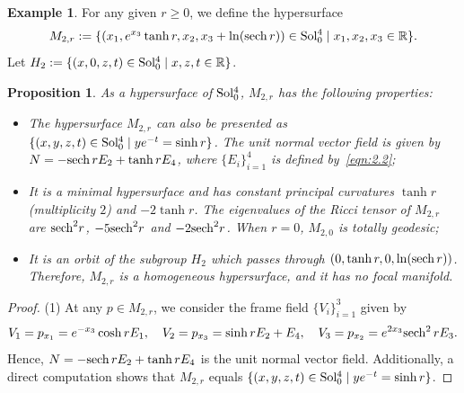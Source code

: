 \documentclass[reqno]{amsart}%
\newtheorem{proposition}[theorem]{Proposition}
\theoremstyle{definition}
\newtheorem{example}{Example}[section]  %
\numberwithin{equation}{section}
\begin{document}
	\begin{example}\label{exam:3.7}
		For any given $r\geq0$, we define the hypersurface
		$$
		M_{2,r}:=\{(x_1,e^{x_3}\tanh r,x_2,{x_3}+\ln ({\rm sech}\, r))\in {\rm Sol_0^4}
		\mid x_1,x_2,x_3\in \mathbb{R}\}.
		$$
		Let $H_2:=\{(x,0,z,t)\in {\rm Sol_0^4}\mid x,z,t\in \mathbb{R}\}$.
		\begin{proposition}\label{prop:M2r}
			As a hypersurface of ${\rm Sol_0^4}$,
			$M_{2,r}$ has the following properties:
			\begin{itemize}
				
				\vskip1mm
				\item[(1)]
				The hypersurface $M_{2,r}$ can also be presented as $\{(x,y,z,t)\in {\rm Sol_0^4}
				\mid  ye^{-t}=\sinh r\}$.  
				The unit normal vector field is given by $N=-{\rm sech}\, r E_2+\tanh r E_4$,
				where $\{E_i\}_{i=1}^4$ is defined by~\eqref{eqn:2.2};
				
				\vskip1mm
				\item[(2)]
				It is a minimal hypersurface and has constant principal curvatures
				$\tanh r$ (multiplicity $2$) and $-2\tanh r$. 
				The eigenvalues of the Ricci tensor of $M_{2,r}$ are ${\rm sech}^2 r$, $-5 {\rm sech}^2 r$ and $-2 {\rm sech}^2 r$.
				When $r=0$, $M_{2,0}$ is totally geodesic;
				
				\vskip1mm
				\item[(3)]
				It is an orbit of the subgroup $H_2$
				which passes through $(0,\tanh r,0,\ln ({\rm sech}\, r))$. Therefore,
				$M_{2,r}$ is a homogeneous hypersurface, and it has no focal manifold.
			\end{itemize}
		\end{proposition}
		
		\begin{proof}
			(1) At any $p\in M_{2,r}$, we consider the frame field
			$\{V_i\}_{i=1}^3$ given by
			$$
			V_1=p_{x_1}=e^{-x_3}\cosh r E_1,
			\quad V_2=p_{x_3}=\sinh r E_2+E_4,
			\quad V_3=p_{x_2}=e^{2x_3}{\rm sech^2}\, r E_3.
			$$
			Hence, $N=-{\rm sech}\, r E_2+\tanh r E_4$ is the unit normal vector field.
			Additionally, a direct computation shows that $M_{2,r}$ equals $\{(x,y,z,t)\in {\rm Sol_0^4}
			\mid  ye^{-t}=\sinh r\}$.
			

\end{proof}
\end{example}
\end{document}

